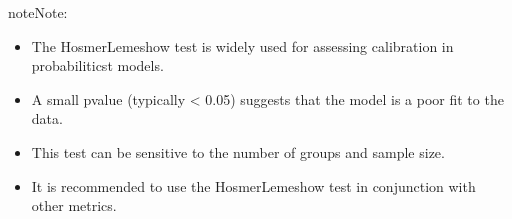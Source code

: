 \documentclass[letterpaper,10pt,english]{sphinxmanual}
\begin{document}
\begin{fulllineitems}
\begin{quote}
\begin{description}
\begin{itemize}
\end{itemize}

\end{description}\end{quote}

\begin{sphinxadmonition}{note}{Note:}\begin{itemize}
\item {} 
\sphinxAtStartPar
The Hosmer\sphinxhyphen{}Lemeshow test is widely used for assessing calibration in probabiliticst models.

\item {} 
\sphinxAtStartPar
A small p\sphinxhyphen{}value (typically \textless{} 0.05) suggests that the model is a poor fit to the data.

\item {} 
\sphinxAtStartPar
This test can be sensitive to the number of groups and sample size.

\item {} 
\sphinxAtStartPar
It is recommended to use the Hosmer\sphinxhyphen{}Lemeshow test in conjunction with other metrics.

\end{itemize}
\end{sphinxadmonition}

\end{fulllineitems}

\end{document}

